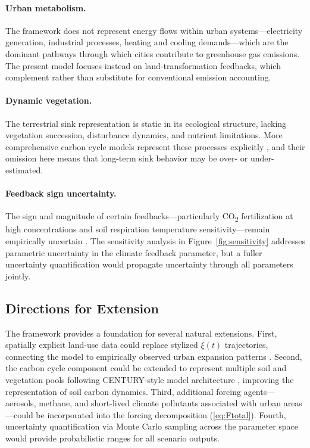 \documentclass[12pt]{article}
\begin{document}
\paragraph{Urban metabolism.}
The framework does not represent energy flows within urban systems---electricity
generation, industrial processes, heating and cooling demands---which are the
dominant pathways through which cities contribute to greenhouse gas emissions.
The present model focuses instead on land-transformation feedbacks, which
complement rather than substitute for conventional emission accounting.

\paragraph{Dynamic vegetation.}
The terrestrial sink representation is static in its ecological structure,
lacking vegetation succession, disturbance dynamics, and nutrient limitations.
More comprehensive carbon cycle models represent these processes explicitly
\citep{Parton1987}, and their omission here means that long-term sink behavior
may be over- or under-estimated.

\paragraph{Feedback sign uncertainty.}
The sign and magnitude of certain feedbacks---particularly CO\textsubscript{2}
fertilization at high concentrations and soil respiration temperature
sensitivity---remain empirically uncertain \citep{Davidson2006}.  The
sensitivity analysis in Figure~\ref{fig:sensitivity} addresses parametric
uncertainty in the climate feedback parameter, but a fuller uncertainty
quantification would propagate uncertainty through all parameters jointly.

\subsection{Directions for Extension}

The framework provides a foundation for several natural extensions.  First,
spatially explicit land-use data could replace stylized $\xi(t)$ trajectories,
connecting the model to empirically observed urban expansion patterns
\citep{Seto2012,Angel2011}.  Second, the carbon cycle component could be
extended to represent multiple soil and vegetation pools following CENTURY-style
model architecture \citep{Parton1987}, improving the representation of soil
carbon dynamics.  Third, additional forcing agents---aerosols, methane, and
short-lived climate pollutants associated with urban areas---could be
incorporated into the forcing decomposition (\ref{eq:Ftotal}).  Fourth,
uncertainty quantification via Monte Carlo sampling across the parameter space
would provide probabilistic ranges for all scenario outputs.
\end{document}
